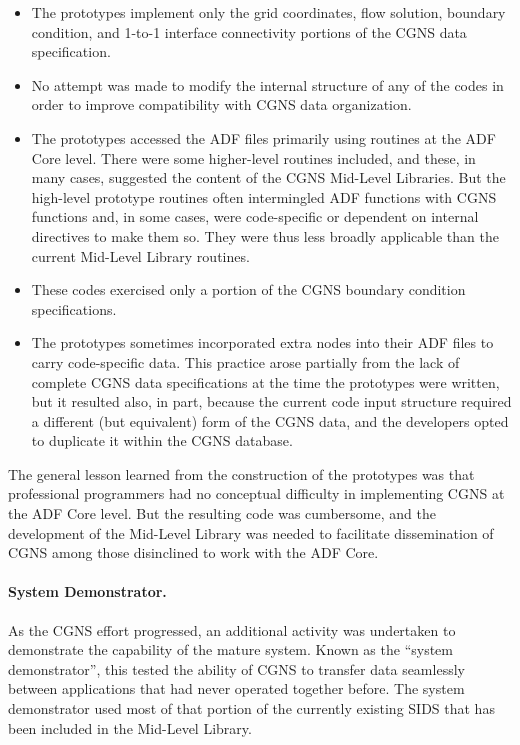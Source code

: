 \begin{itemize}
\item The prototypes implement only the grid coordinates, flow solution,
      boundary condition, and 1-to-1 interface connectivity portions of
      the CGNS data specification.
\item No attempt was made to modify the internal structure of any of
      the codes in order to improve compatibility with CGNS data
      organization.
\item The prototypes accessed the ADF files primarily using routines
      at the ADF Core level.
      There were some higher-level routines included, and these, in many
      cases, suggested the content of the CGNS Mid-Level Libraries.
      But the high-level prototype routines often intermingled
      ADF functions with CGNS functions and, in some cases, were
      code-specific or dependent on internal directives to make them so.
      They were thus less broadly applicable than the current Mid-Level
      Library routines.
\item These codes exercised only a portion of the CGNS boundary
      condition specifications. 
\item The prototypes sometimes incorporated extra nodes into their ADF
      files to carry code-specific data.
      This practice arose partially from the lack of complete CGNS data
      specifications at the time the prototypes were written, but it
      resulted also, in part, because the current code input structure
      required a different (but equivalent) form of the CGNS data, and
      the developers opted to duplicate it within the CGNS database.
\end{itemize}

The general lesson learned from the construction of the prototypes
was that professional programmers had no conceptual difficulty in
implementing CGNS at the ADF Core level.
But the resulting code was cumbersome, and the development of the
Mid-Level Library was needed to facilitate dissemination of CGNS among
those disinclined to work with the ADF Core.

\paragraph{System Demonstrator.}
As the CGNS effort progressed, an additional activity was undertaken
to demonstrate the capability of the mature system.
Known as the ``system demonstrator'', this tested the ability of CGNS to
transfer data seamlessly between applications that had never operated
together before.
The system demonstrator used most of that portion of the currently
existing SIDS that has been included in the Mid-Level Library.

